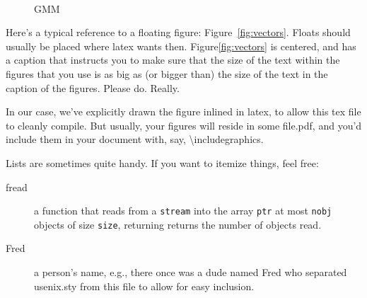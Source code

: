 \documentclass[a4paper,10pt,titlepage]{ctexart}
\begin{document}
\begin{figure}[!htbp]
	\centering
	\\
	\caption{GMM}
	\label{fig:gmm}
\end{figure}

Here's a typical reference to a floating figure:
Figure~\ref{fig:vectors}. Floats should usually be placed where latex
wants then. Figure\ref{fig:vectors} is centered, and has a caption
that instructs you to make sure that the size of the text within the
figures that you use is as big as (or bigger than) the size of the
text in the caption of the figures. Please do. Really.

In our case, we've explicitly drawn the figure inlined in latex, to
allow this tex file to cleanly compile. But usually, your figures will
reside in some file.pdf, and you'd include them in your document
with, say, \textbackslash{}includegraphics.

Lists are sometimes quite handy. If you want to itemize things, feel
free:

\begin{description}
  
\item[fread] a function that reads from a \texttt{stream} into the
  array \texttt{ptr} at most \texttt{nobj} objects of size
  \texttt{size}, returning returns the number of objects read.

\item[Fred] a person's name, e.g., there once was a dude named Fred
  who separated usenix.sty from this file to allow for easy
  inclusion.
\end{description}
\end{document}
